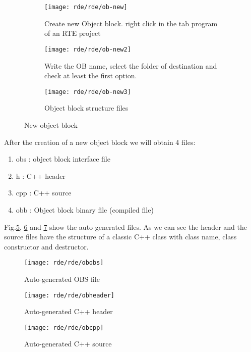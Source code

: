 \begin{figure}[h]
	\centering
	\begin{subfigure}{0.6\textwidth}
		\texttt{[image: rde/rde/ob-new]}
		\caption{Create new Object block. right click in the tab program of an RTE project}
		\label{fig:ob-new}
	\end{subfigure}
	\quad
	\begin{subfigure}{0.4\textwidth}
		\texttt{[image: rde/rde/ob-new2]}
		\caption{Write the OB name, select the folder of destination and check at least the first option.}
		\label{fig:ob-new2}
	\end{subfigure}
	\begin{subfigure}{0.4\textwidth}
		\texttt{[image: rde/rde/ob-new3]}
		\caption{Object block structure files}
		\label{fig:ob-new3}
	\end{subfigure}
	\caption{New object block}
	\label{fig:obnew}
\end{figure}

After the creation of a new object block we will obtain 4 files:
\begin{enumerate}
	\item obs : object block interface file
	\item h : C++ header
	\item cpp : C++ source
	\item obb : Object block binary file (compiled file)
\end{enumerate}

Fig.\ref{fig:obobs}, \ref{fig:obheader} and \ref{fig:obcpp} show the auto generated files. As we can see the header and the source files have the structure of a classic C++ class with class name, class constructor and destructor.
\begin{figure}[h]
	\centering\texttt{[image: rde/rde/obobs]}
	\caption{Auto-generated OBS file}
	\label{fig:obobs}
\end{figure}

\begin{figure}[h]
	\centering\texttt{[image: rde/rde/obheader]}
	\caption{Auto-generated C++ header}
	\label{fig:obheader}
\end{figure}

\begin{figure}[h]
	\centering\texttt{[image: rde/rde/obcpp]}
	\caption{Auto-generated C++ source}
	\label{fig:obcpp}
\end{figure}

